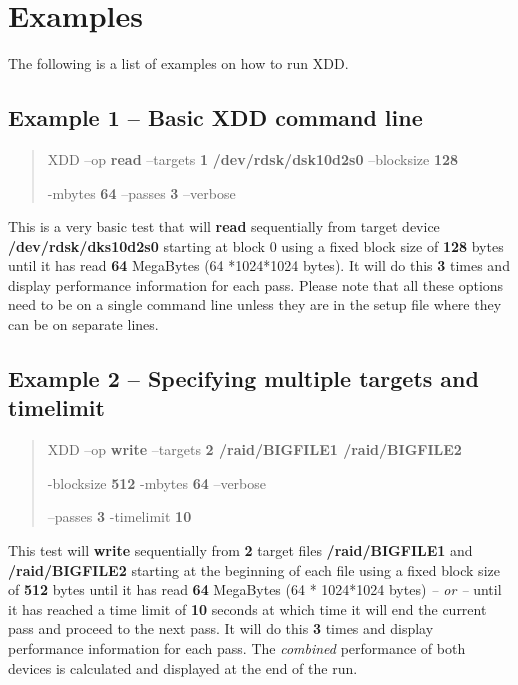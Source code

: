 \newpage
\section{Examples}\label{examples}

The following is a list of examples on how to run XDD.

\subsection{Example 1 -- Basic XDD command line}\label{example-1-basic-xdd-command-line}

\begin{quote}
XDD --op \textbf{read} --targets \textbf{1} \textbf{/dev/rdsk/dsk10d2s0} --blocksize \textbf{128}

-mbytes \textbf{64} --passes \textbf{3} --verbose
\end{quote}

This is a very basic test that will \textbf{read} sequentially from target device \textbf{/dev/rdsk/dks10d2s0} starting at block 0 using a fixed block size of \textbf{128} bytes until it has read \textbf{64} MegaBytes (64 *1024*1024 bytes). It will do this \textbf{3} times and display performance information for each pass. Please note that all these options need to be on a single command line unless they are in the setup file where they can be on separate lines.

\subsection{Example 2 -- Specifying multiple targets and timelimit}\label{example-2-specifying-multiple-targets-and-timelimit}

\begin{quote}
XDD --op \textbf{write} --targets \textbf{2 /raid/BIGFILE1 /raid/BIGFILE2}

-blocksize \textbf{512} -mbytes \textbf{64} --verbose

--passes \textbf{3} -timelimit \textbf{10}
\end{quote}

This test will \textbf{write} sequentially from \textbf{2} target files \textbf{/raid/BIGFILE1} and \textbf{/raid/BIGFILE2} starting at the beginning of each file using a fixed block size of \textbf{512} bytes until it has read \textbf{64} MegaBytes (64 * 1024*1024 bytes) \emph{-- or --} until it has reached a time limit of \textbf{10} seconds at which time it will end the current pass and proceed to the next pass. It will do this \textbf{3} times and display performance information for each pass. The \emph{combined} performance of both devices is calculated and displayed at the end of the run.

